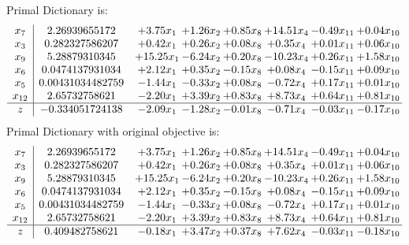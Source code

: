 \documentclass[9pt]{article}
\begin{document}
Primal Dictionary is:
\[\begin{array}{c| c c@{\hskip 2pt} c@{\hskip 2pt} c@{\hskip 2pt} c@{\hskip 2pt} c@{\hskip 2pt} c@{\hskip 2pt} }
 x_{7}   &  2.26939655172 & +  3.75 x_{1} & +  1.26 x_{2} & +  0.85 x_{8} & + 14.51 x_{4} & -0.49 x_{11} & +  0.04 x_{10}\\
 x_{3}   &  0.282327586207 & +  0.42 x_{1} & +  0.26 x_{2} & +  0.08 x_{8} & +  0.35 x_{4} & +  0.01 x_{11} & +  0.06 x_{10}\\
 x_{9}   &  5.28879310345 & + 15.25 x_{1} & -6.24 x_{2} & +  0.20 x_{8} & -10.23 x_{4} & +  0.26 x_{11} & +  1.58 x_{10}\\
 x_{6}   &  0.0474137931034 & +  2.12 x_{1} & +  0.35 x_{2} & -0.15 x_{8} & +  0.08 x_{4} & -0.15 x_{11} & +  0.09 x_{10}\\
 x_{5}   &  0.00431034482759 & -1.44 x_{1} & -0.33 x_{2} & +  0.08 x_{8} & -0.72 x_{4} & +  0.17 x_{11} & +  0.01 x_{10}\\
 x_{12}   &  2.65732758621 & -2.20 x_{1} & +  3.39 x_{2} & +  0.83 x_{8} & +  8.73 x_{4} & +  0.64 x_{11} & +  0.81 x_{10}\\
\hline
z    &  -0.334051724138 & -2.09 x_{1} & -1.28 x_{2} & -0.01 x_{8} & -0.71 x_{4} & -0.03 x_{11} & -0.17 x_{10}\\
\end{array}\]
Primal Dictionary with original objective is:
\[\begin{array}{c| c c@{\hskip 2pt} c@{\hskip 2pt} c@{\hskip 2pt} c@{\hskip 2pt} c@{\hskip 2pt} c@{\hskip 2pt} }
 x_{7}   &  2.26939655172 & +  3.75 x_{1} & +  1.26 x_{2} & +  0.85 x_{8} & + 14.51 x_{4} & -0.49 x_{11} & +  0.04 x_{10}\\
 x_{3}   &  0.282327586207 & +  0.42 x_{1} & +  0.26 x_{2} & +  0.08 x_{8} & +  0.35 x_{4} & +  0.01 x_{11} & +  0.06 x_{10}\\
 x_{9}   &  5.28879310345 & + 15.25 x_{1} & -6.24 x_{2} & +  0.20 x_{8} & -10.23 x_{4} & +  0.26 x_{11} & +  1.58 x_{10}\\
 x_{6}   &  0.0474137931034 & +  2.12 x_{1} & +  0.35 x_{2} & -0.15 x_{8} & +  0.08 x_{4} & -0.15 x_{11} & +  0.09 x_{10}\\
 x_{5}   &  0.00431034482759 & -1.44 x_{1} & -0.33 x_{2} & +  0.08 x_{8} & -0.72 x_{4} & +  0.17 x_{11} & +  0.01 x_{10}\\
 x_{12}   &  2.65732758621 & -2.20 x_{1} & +  3.39 x_{2} & +  0.83 x_{8} & +  8.73 x_{4} & +  0.64 x_{11} & +  0.81 x_{10}\\
\hline
z    &  0.409482758621 & -0.18 x_{1} & +  3.47 x_{2} & +  0.37 x_{8} & +  7.62 x_{4} & -0.03 x_{11} & -0.18 x_{10}\\
\end{array}\]
\end{document}
